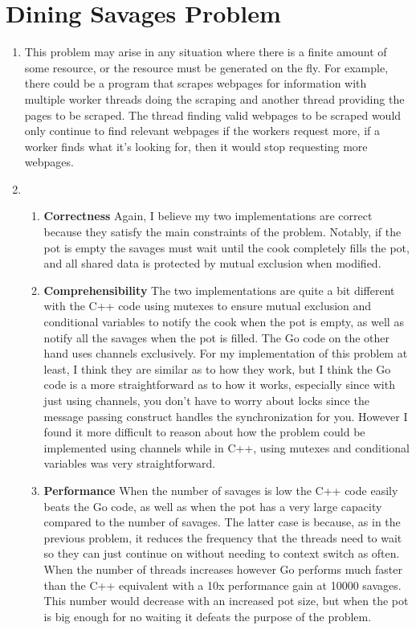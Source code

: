 \documentclass[11pt]{article}
\begin{document}
\section{Dining Savages Problem}
\begin{enumerate}
	\item This problem may arise in any situation where there is a finite amount of some resource, or the resource must be generated on the fly. For example, there could be a program that scrapes webpages for information with multiple worker threads doing the scraping and another thread providing the pages to be scraped. The thread finding valid webpages to be scraped would only continue to find relevant webpages if the workers request more, if a worker finds what it's looking for, then it would stop requesting more webpages.
	
	\item
	\begin{enumerate}
	\item \textbf{Correctness}\linebreak
	Again, I believe my two implementations are correct because they satisfy the main constraints of the problem. Notably, if the pot is empty the savages must wait until the cook completely fills the pot, and all shared data is protected by mutual exclusion when modified.
	\item \textbf{Comprehensibility}\linebreak
	The two implementations are quite a bit different with the C++ code using mutexes to ensure mutual exclusion and conditional variables to notify the cook when the pot is empty, as well as notify all the savages when the pot is filled. The Go code on the other hand uses channels exclusively. For my implementation of this problem at least, I think they are similar as to how they work, but I think the Go code is a more straightforward as to how it works, especially since with just using channels, you don't have to worry about locks since the message passing construct handles the synchronization for you. However I found it more difficult to reason about how the problem could be implemented using channels while in C++, using mutexes and conditional variables was very straightforward.
	\item \textbf{Performance}\linebreak
	When the number of savages is low the C++ code easily beats the Go code, as well as when the pot has a very large capacity compared to the number of savages. The latter case is because, as in the previous problem, it reduces the frequency that the threads need to wait so they can just continue on without needing to context switch as often. When the number of threads increases however Go performs much faster than the C++ equivalent with a 10x performance gain at 10000 savages. This number would decrease with an increased pot size, but when the pot is big enough for no waiting it defeats the purpose of the problem.
	\end{enumerate}
\end{enumerate}
\end{document}
